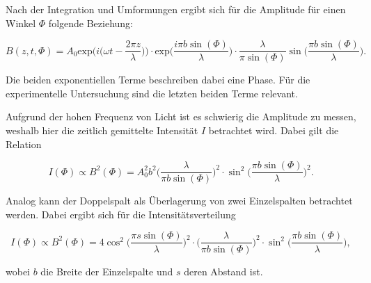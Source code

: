 Nach der Integration und Umformungen ergibt sich für die Amplitude für einen Winkel $\Phi$ folgende Beziehung:

\begin{equation}
    \label{eqn:amp-integration}
    B(z, t, \Phi) = A_0 \text{exp} \bigg( i \bigg( \omega t - \frac{2 \pi z}{\lambda} \bigg) \bigg) \cdot \text{exp} \bigg( \frac{i \pi b \sin (\Phi)}{\lambda} \bigg) \cdot \frac{\lambda}{\pi \sin( \Phi )} \sin \bigg( \frac{\pi b \sin(\Phi )}{\lambda} \bigg).
\end{equation}

Die beiden exponentiellen Terme beschreiben dabei eine Phase. Für die experimentelle Untersuchung sind die letzten beiden Terme relevant.

Aufgrund der hohen Frequenz von Licht ist es schwierig die Amplitude zu messen, weshalb hier die zeitlich gemittelte Intensität $I$ betrachtet wird. Dabei gilt die Relation

\begin{equation}
    \label{eqn:intensitaet-einzel}
    I ( \Phi ) \propto B^2 ( \Phi ) = A_0^2 b^2 \bigg( \frac{\lambda}{\pi b \sin ( \Phi )} \bigg)^2 \cdot \sin^2 \bigg( \frac{\pi b \sin(\Phi)}{\lambda} \bigg)^2.
\end{equation}

Analog kann der Doppelspalt als Überlagerung von zwei Einzelspalten betrachtet werden.
Dabei ergibt sich für die Intensitätsverteilung

\begin{equation}
    \label{eqn:intensitaet-doppel}
    I ( \Phi ) \propto B^2 (\Phi ) = 4 \cos^2 \bigg ( \frac{\pi s \sin( \Phi )}{\lambda} \bigg)^2 \cdot \bigg( \frac{\lambda}{\pi b \sin( \Phi )} \bigg)^2 \cdot \sin^2 \bigg( \frac{\pi b \sin ( \Phi )}{\lambda} \bigg),
\end{equation}

wobei $b$ die Breite der Einzelspalte und $s$ deren Abstand ist.